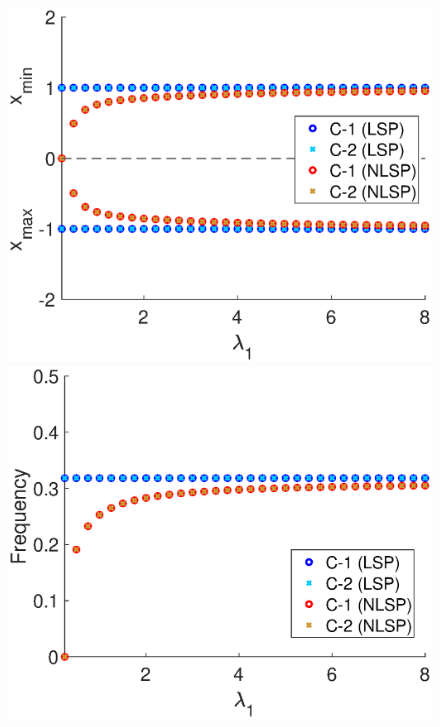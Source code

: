 \begin{figure}[h]
  \begin{minipage}{0.45\linewidth}
  \centering
    \includegraphics[width=1\linewidth]{Images/photo18_3.eps} 
  \end{minipage} 
  \begin{minipage}{0.45\linewidth}
  \centering
    \includegraphics[width=1\linewidth]{Images/photo18_4.eps} 
  \end{minipage} 
  

\end{figure}
